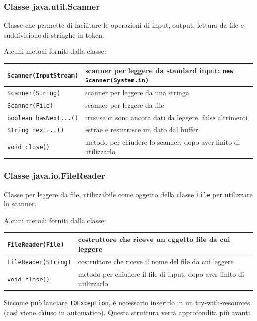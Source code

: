 \documentclass{article}
\begin{document}
\subsubsection*{Classe java.util.Scanner}
Classe che permette di facilitare le operazioni di input, output, lettura da file e suddivisione di stringhe in token.

Alcuni metodi forniti dalla classe:
\begin{center}
	\begin{tabularx}{\textwidth}{l X}
		\toprule
		\verb|Scanner(InputStream)| & scanner per leggere da standard input: \verb|new Scanner(System.in)| \\
		\midrule
		\verb|Scanner(String)| & scanner per leggere da una stringa \\
		\midrule
		\verb|Scanner(File)| & scanner per leggere da file \\
		\midrule
		\verb|boolean hasNext...()| & true se ci sono ancora dati da leggere, false altrimenti \\
		\midrule
		\verb|String next...()| & estrae e restituisce un dato dal buffer \\
		\midrule
		\verb|void close()| & metodo per chiudere lo scanner, dopo aver finito di utilizzarlo \\
		\bottomrule
	\end{tabularx}
\end{center}

\subsubsection*{Classe java.io.FileReader}
Classe per leggere da file, utilizzabile come oggetto della classe \verb|File| per utilizzare lo scanner.

Alcuni metodi forniti dalla classe:
\begin{center}
	\begin{tabularx}{\textwidth}{l X}
		\toprule
		\verb|FileReader(File)| & costruttore che riceve un oggetto file da cui leggere \\
		\midrule
		\verb|FileReader(String)| & costruttore che riceve il nome del file da cui leggere \\
		\midrule
		\verb|void close()| & metodo per chiudere il file di input, dopo aver finito di utilizzarlo \\
		\bottomrule
	\end{tabularx}
\end{center}

Siccome può lanciare \verb|IOException|, è necessario inserirlo in un try-with-resources (così viene chiuso in automatico).
Questa struttura verrà approfondita più avanti.
\end{document}
